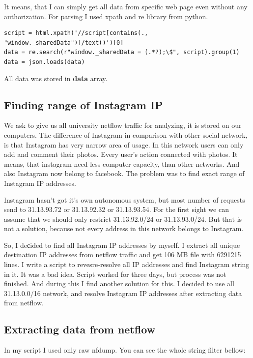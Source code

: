 It means, that I can simply get all data from specific web page even without any authorization. For parsing I used xpath and re library from python. 

\begin{lstlisting}
script = html.xpath('//script[contains(., "window._sharedData")]/text()')[0]
data = re.search(r"window._sharedData = (.*?);\$", script).group(1)
data = json.loads(data)
\end{lstlisting}

All data was stored in \textbf{data} array.

\subsection{Finding range of Instagram IP}

We ask to give us all university netflow traffic for analyzing, it is stored on our computers. The difference of Instagram in comparison with other social network, is that Instagram has very narrow area of usage. In this network users can only add and comment their photos. Every user's action connected with photos. It means, that instagram need less computer capacity, than other networks. And also Instagram now belong to facebook. The problem was to find exact range of Instagram IP addresses. 

Instagram hasn't got it's own autonomous system, but most number of requests send to 31.13.93.72 or 31.13.92.32 or 31.13.93.54. For the first sight we can assume that we should only restrict 31.13.92.0/24 or 31.13.93.0/24. But that is not a solution, because not every address in this network belongs to Instagram.

So, I deсided to find all Instagram IP addresses by myself. I extract all unique destination IP addresses from netflow traffic and get 106 MB file with 6291215 lines. I write a script to revesre-resolve all IP addresses and find Instagram string in it. It was a bad idea. Script worked for three days, but process was not finished. And during this I find another solution for this. I decided to use all 31.13.0.0/16 network, and resolve Instagram IP addresses after extracting data from netflow.

\subsection{Extracting data from netflow}

In my script I used only raw nfdump. You can see the whole string filter bellow:

